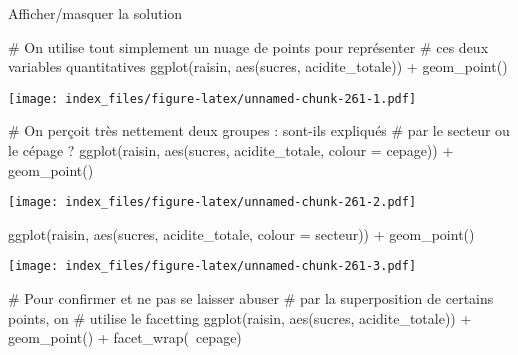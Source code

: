 \documentclass[12pt,]{article}
\newenvironment{Shaded}{}{}
\newcommand{\KeywordTok}[1]{\textcolor[rgb]{0.00,0.00,1.00}{{#1}}}
\newcommand{\DataTypeTok}[1]{{#1}}
\newcommand{\StringTok}[1]{\textcolor[rgb]{0.00,0.50,0.50}{{#1}}}
\newcommand{\CommentTok}[1]{\textcolor[rgb]{0.00,0.50,0.00}{{#1}}}
\newcommand{\NormalTok}[1]{{#1}}
\begin{document}
\begin{enumerate}
  Afficher/masquer la solution

  \hypertarget{sol72}{}
\begin{Shaded}
\begin{Highlighting}[]
\CommentTok{# On utilise tout simplement un nuage de points pour représenter}
\CommentTok{# ces deux variables quantitatives}
\KeywordTok{ggplot}\NormalTok{(raisin, }\KeywordTok{aes}\NormalTok{(sucres, acidite_totale)) +}\StringTok{ }\KeywordTok{geom_point}\NormalTok{()}
\end{Highlighting}
\end{Shaded}

  \texttt{[image: index\_files/figure-latex/unnamed-chunk-261-1.pdf]}

\begin{Shaded}
\begin{Highlighting}[]

\CommentTok{# On perçoit très nettement deux groupes : sont-ils expliqués}
\CommentTok{# par le secteur ou le cépage ? }
\KeywordTok{ggplot}\NormalTok{(raisin, }\KeywordTok{aes}\NormalTok{(sucres, acidite_totale, }\DataTypeTok{colour =} \NormalTok{cepage)) +}\StringTok{ }\KeywordTok{geom_point}\NormalTok{()}
\end{Highlighting}
\end{Shaded}

  \texttt{[image: index\_files/figure-latex/unnamed-chunk-261-2.pdf]}

\begin{Shaded}
\begin{Highlighting}[]
\KeywordTok{ggplot}\NormalTok{(raisin, }\KeywordTok{aes}\NormalTok{(sucres, acidite_totale, }\DataTypeTok{colour =} \NormalTok{secteur)) +}\StringTok{ }\KeywordTok{geom_point}\NormalTok{()}
\end{Highlighting}
\end{Shaded}

  \texttt{[image: index\_files/figure-latex/unnamed-chunk-261-3.pdf]}

\begin{Shaded}
\begin{Highlighting}[]

\CommentTok{# Pour confirmer et ne pas se laisser abuser}
\CommentTok{# par la superposition de certains points, on }
\CommentTok{# utilise le facetting}
\KeywordTok{ggplot}\NormalTok{(raisin, }\KeywordTok{aes}\NormalTok{(sucres, acidite_totale)) +}\StringTok{ }\KeywordTok{geom_point}\NormalTok{() +}\StringTok{ }
\StringTok{  }\KeywordTok{facet_wrap}\NormalTok{(~cepage)}
\end{Highlighting}
\end{Shaded}


\end{enumerate}
\end{document}
